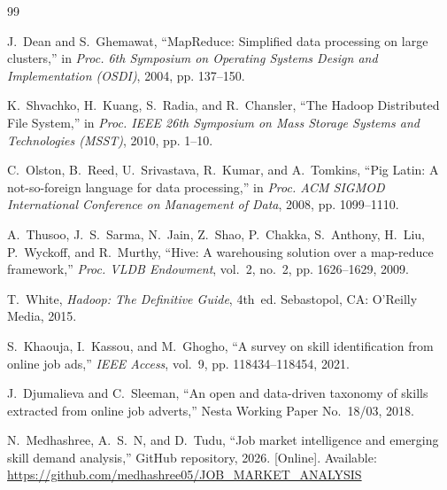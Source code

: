 \documentclass[10pt,a4paper]{article}
\begin{document}
\begin{thebibliography}{99}

J.~Dean and S.~Ghemawat, ``MapReduce: Simplified data processing on large clusters,'' in \textit{Proc. 6th Symposium on Operating Systems Design and Implementation (OSDI)}, 2004, pp. 137--150.

K.~Shvachko, H.~Kuang, S.~Radia, and R.~Chansler, ``The Hadoop Distributed File System,'' in \textit{Proc. IEEE 26th Symposium on Mass Storage Systems and Technologies (MSST)}, 2010, pp. 1--10.

C.~Olston, B.~Reed, U.~Srivastava, R.~Kumar, and A.~Tomkins, ``Pig Latin: A not-so-foreign language for data processing,'' in \textit{Proc. ACM SIGMOD International Conference on Management of Data}, 2008, pp. 1099--1110.

A.~Thusoo, J.~S.~Sarma, N.~Jain, Z.~Shao, P.~Chakka, S.~Anthony, H.~Liu, P.~Wyckoff, and R.~Murthy, ``Hive: A warehousing solution over a map-reduce framework,'' \textit{Proc. VLDB Endowment}, vol.~2, no.~2, pp. 1626--1629, 2009.

T.~White, \textit{Hadoop: The Definitive Guide}, 4th~ed. Sebastopol, CA: O'Reilly Media, 2015.

S.~Khaouja, I.~Kassou, and M.~Ghogho, ``A survey on skill identification from online job ads,'' \textit{IEEE Access}, vol.~9, pp. 118434--118454, 2021.

J.~Djumalieva and C.~Sleeman, ``An open and data-driven taxonomy of skills extracted from online job adverts,'' Nesta Working Paper No.~18/03, 2018.

N.~Medhashree, A.~S.~N, and D.~Tudu, ``Job market intelligence and emerging skill demand analysis,'' GitHub repository, 2026. [Online]. Available: \url{https://github.com/medhashree05/JOB_MARKET_ANALYSIS}
\end{thebibliography}
\end{document}
